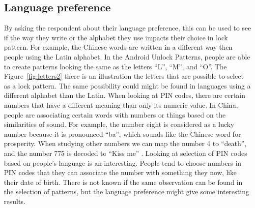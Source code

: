       \subsection*{Language preference} By asking the respondent about their language preference, this can be used to see if the way they write or the alphabet they use impacts their choice in lock pattern. For example, the Chinese words are written in a different way then people using the Latin alphabet. In the Android Unlock Patterns, people are able to create patterns looking the same as the letters ``L'', ``M'', and ``O''. The Figure~\ref{fig:letters2} there is an illustration the letters that are possible to select as a lock pattern. The same possibility could might be found in languages using a different alphabet than the Latin. When looking at PIN codes, there are certain numbers that have a different meaning than only its numeric value. In China, people are associating certain words with numbers or things based on the similarities of sound. For example, the number eight is considered as a lucky number because it is pronounced ``ba'', which sounds like the Chinese word for prosperity. When studying other numbers we can map the number 4 to ``death'', and the number 775 is decoded to ``Kiss me'' \cite{ChineseChatCodes}. Looking at selection of PIN codes based on people's language is an interesting. People tend to choose numbers in PIN codes that they can associate the number with something they now, like their date of birth. There is not known if the same observation can be found in the selection of patterns, but the language preference might give some interesting results.

